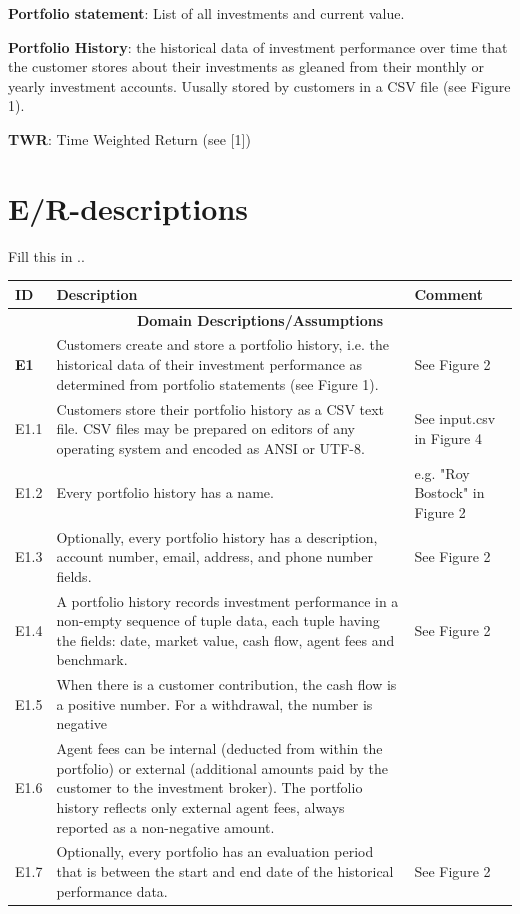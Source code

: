 \documentclass[runningheads,12pt]{article}
\begin{document}
\noindent\textbf{Portfolio statement}: List of all investments and current value.\smallskip

\noindent\textbf{Portfolio History}: the historical data of investment performance over time that the customer stores about their investments as gleaned from their monthly or yearly investment accounts. Uusally stored by customers in a CSV file (see Figure 1).\smallskip

\noindent\textbf{TWR}: Time Weighted Return (see [1])\smallskip

\section{E/R-descriptions}
Fill this in ..


\centering
\begin{tabular}{|l|p{9cm}|p{3cm}|}
\hline
\textbf{ID} & \textbf{Description} & \textbf{Comment}\\


\hline
\multicolumn{3}{|c|}{\textbf{Domain Descriptions/Assumptions}}\\

\hline
\textbf{E1} & Customers create and store a portfolio history, i.e. the historical data of their investment performance as determined from portfolio statements (see Figure 1). & See Figure 2\\

\hline
E1.1 & Customers store their portfolio history as a CSV text file. CSV files may be prepared on editors of any operating system and encoded as ANSI or UTF-8. & See input.csv in Figure 4\\

\hline
E1.2 & Every portfolio history has a name. & e.g. "Roy Bostock" in Figure 2\\

\hline
E1.3 & Optionally, every portfolio history has a description, account number, email, address, and phone number fields. & See Figure 2\\

\hline
E1.4 & A portfolio history records investment performance in a non-empty sequence of tuple data, each tuple having the fields: date, market value, cash flow, agent fees and benchmark. & See Figure 2\\

\hline
E1.5 & When there is a customer contribution, the cash flow is a positive number. For a withdrawal, the number is negative & \\

\hline
E1.6 & Agent fees can be internal (deducted from within the portfolio) or external (additional amounts paid by the customer to the investment broker). The portfolio history reflects only external agent fees, always reported as a non-negative amount. & \\

\hline
E1.7 & Optionally, every portfolio has an evaluation period that is between the start and end date of the historical performance data. & See Figure 2 \\

\hline
\end{tabular}
\end{document}
